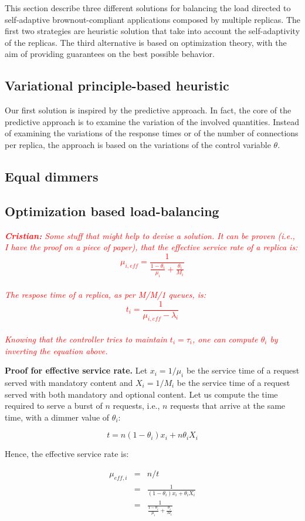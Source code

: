 This section describe three different solutions for balancing the load
directed to self-adaptive brownout-compliant applications composed by
multiple replicas. The first two strategies are heuristic solution
that take into account the self-adaptivity of the replicas. The third
alternative is based on optimization theory, with the aim of providing
guarantees on the best possible behavior.

\subsection{Variational principle-based heuristic}

Our first solution is inspired by the predictive approach. In fact,
the core of the predictive approach is to examine the variation of the
involved quantities. Instead of examining the variations of the
response times or of the number of connections per replica, the
approach is based on the variations of the control variable $\theta$.

\subsection{Equal dimmers}

\subsection{Optimization based load-balancing}

\textcolor{red}{\textit{\textbf{Cristian:} Some stuff that might help
    to devise a solution. It can be proven (i.e., I have the proof on
    a piece of paper), that the effective service rate of a replica
    is: $$\mu_{i,eff}=\frac{1}{\frac{1-\theta_i}{\mu_i}+\frac{\theta_i}{M_i}}$$
    \\
    The respose time of a replica, as per M/M/1 queues, is:
    \\
    $$t_i=\frac{1}{\mu_{i,eff}-\lambda_i}$$
    \\
    Knowing that the controller tries to maintain $t_i=\tau_i$, one
    can compute $\theta_i$ by inverting the equation above.
}}
	
\textbf{Proof for effective service rate.} Let $x_i = 1/\mu_i$ be the service time of a request served with mandatory content and $X_i = 1/M_i$ be the service time of a request served with both mandatory and optional content. Let us compute the time required to serve a burst of $n$ requests, i.e., $n$ requests that arrive at the same time, with a dimmer value of $\theta_i$:

$$t=n (1-\theta_i) x_i + n \theta_i X_i$$

Hence, the effective service rate is:

\begin{eqnarray*}
\mu_{eff,i} & = & n/t \\
& = & \frac{1}{(1-\theta_i) x_i + \theta_i X_i} \\
& = & \frac{1}{\frac{1-\theta_i}{\mu_i} + \frac{\theta_i}{M_i}}
\end{eqnarray*}

